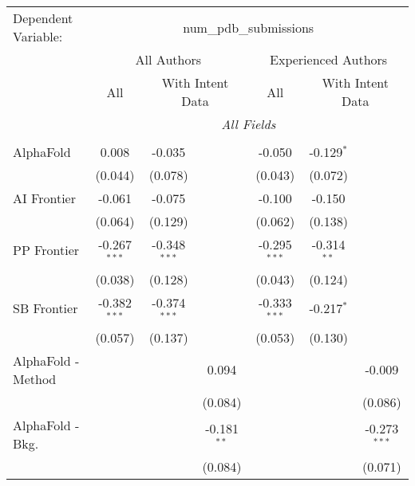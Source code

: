 \begingroup
\centering
\begin{tabular}{lcccccc}
   \tabularnewline \midrule \midrule
   Dependent Variable: & \multicolumn{6}{c}{num\_pdb\_submissions}\\
 & \multicolumn{3}{c}{All Authors} & \multicolumn{3}{c}{Experienced Authors} \\
\cmidrule(lr){2-4} \cmidrule(lr){5-7}
 & \multicolumn{1}{c}{All} & \multicolumn{2}{c}{With Intent Data} & \multicolumn{1}{c}{All} & \multicolumn{2}{c}{With Intent Data} \\
\cmidrule(lr){2-2} \cmidrule(lr){3-4} \cmidrule(lr){5-5} \cmidrule(lr){6-7}
 & \multicolumn{6}{c}{\textit{All Fields}} \\ \\
   AlphaFold            & 0.008          & -0.035         &                & -0.050         & -0.129$^{*}$  &   \\   
                        & (0.044)        & (0.078)        &                & (0.043)        & (0.072)       &   \\   
   AI Frontier          & -0.061         & -0.075         &                & -0.100         & -0.150        &   \\   
                        & (0.064)        & (0.129)        &                & (0.062)        & (0.138)       &   \\   
   PP Frontier          & -0.267$^{***}$ & -0.348$^{***}$ &                & -0.295$^{***}$ & -0.314$^{**}$ &   \\   
                        & (0.038)        & (0.128)        &                & (0.043)        & (0.124)       &   \\   
   SB Frontier          & -0.382$^{***}$ & -0.374$^{***}$ &                & -0.333$^{***}$ & -0.217$^{*}$  &   \\   
                        & (0.057)        & (0.137)        &                & (0.053)        & (0.130)       &   \\   
   AlphaFold - Method   &                &                & 0.094          &                &               & -0.009\\   
                        &                &                & (0.084)        &                &               & (0.086)\\   
   AlphaFold - Bkg.     &                &                & -0.181$^{**}$  &                &               & -0.273$^{***}$\\   
                        &                &                & (0.084)        &                &               & (0.071)\\   

\end{tabular}
